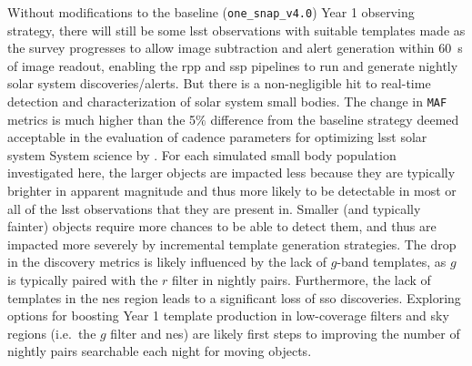 \documentclass[preprintm,linenumbers]{aastex631}
\newcommand{\baseline}{\texttt{one\_snap\_v4.0}\xspace}
\newcommand{\maf}{\texttt{MAF}\xspace}
\begin{document}
		Without modifications to the baseline (\baseline) Year 1 observing strategy, there will still be some \gls*{lsst} observations with suitable templates made as the survey progresses to allow image subtraction and alert generation within 60\ s of image readout, enabling the \gls*{rpp} and \gls*{ssp} pipelines to run and generate nightly solar system discoveries/alerts.
  But there is a non-negligible hit to real-time detection and characterization of solar system small bodies. 
  The change in \maf metrics is much higher than the 5$\%$ difference from the baseline strategy deemed acceptable in the evaluation of cadence parameters for optimizing \gls*{lsst} solar system System science by \cite{schwambTuningLegacySurvey2023}. 
  For each simulated small body population investigated here, the larger objects are impacted less because they are typically brighter in apparent magnitude and thus more likely to be detectable in most or all of the \gls*{lsst} observations that they are present in. 
  Smaller (and typically fainter) objects require more chances to be able to detect them, and thus are impacted more severely by incremental template generation strategies. 
	The drop in the discovery metrics is likely influenced by the lack of $g$-band templates, as $g$ is typically paired with the $r$ filter in nightly pairs. 
  Furthermore, the lack of templates in the \gls*{nes} region leads to a significant loss of \gls*{sso} discoveries.
		Exploring options for boosting Year 1 template production in low-coverage filters and sky regions (i.e.\ the $g$ filter and \gls*{nes}) are likely first steps to improving the number of nightly pairs searchable each night for moving objects. 
		
\end{document}
